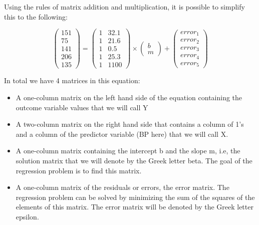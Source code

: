 \documentclass[11pt]{article}
\begin{document}
Using the rules of matrix addition and multiplication, it is possible to simplify this to the following:

\begin{equation*}

\begin{pmatrix}
151 \\
75 \\
141 \\
206 \\
135
\end{pmatrix}
=
\begin{pmatrix}
1 & 32.1 \\
1 & 21.6 \\
1 & 0.5 \\
1 & 25.3 \\
1 & 1100
\end{pmatrix}
\times
\begin{pmatrix}
b \\
m
\end{pmatrix}
+
\begin{pmatrix}
error_1 \\
error_2 \\
error_3 \\
error_4 \\
error_5
\end{pmatrix}
\end{equation*}

In total we have 4 matrices in this equation:

\begin{itemize}
\item A one-column matrix on the left hand side of the equation containing the outcome variable values that we will call Y

\item A two-column matrix on the right hand side that contains a column of 1's and a column of the predictor variable (BP here) that we will call X.

\item A one-column matrix containing the intercept b and the slope m, i.e, the solution matrix that we will denote by the Greek letter beta. The goal of the regression problem is to find this matrix.

\item A one-column matrix of the residuals or errors, the error matrix. The regression problem can be solved by minimizing the sum of the squares of the elements of this matrix. The error matrix will be denoted by the Greek letter epsilon.
\end{itemize}
\end{document}
